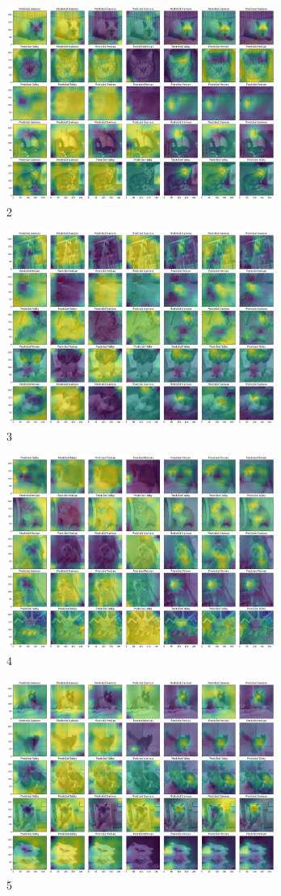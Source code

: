 \documentclass[conference]{IEEEtran}
\begin{document}


\begin{figure} [h]
    \centering
    \includegraphics[height=2.5in]{imgs/cat_grids/2.png}
    \caption{2}
    \label{fig:2}
\end{figure}\begin{figure} [h]
    \centering
    \includegraphics[height=2.5in]{imgs/cat_grids/3.png}
    \caption{3}
    \label{fig:3}
\end{figure}\begin{figure} [h]
    \centering
    \includegraphics[height=2.5in]{imgs/cat_grids/4.png}
    \caption{4}
    \label{fig:4}
\end{figure}
\begin{figure} [h]
    \centering
    \includegraphics[height=2.5in]{imgs/cat_grids/5.png}
    \caption{5}
    \label{fig:5}
\end{figure}
\end{document}
